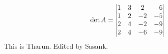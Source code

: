 \documentclass{article}
\begin{document}
$$\det A =
\begin{vmatrix}
1 & 3 & 2 & -6 \\ 
1 & 2 & -2 & -5 \\ 
2 & 4 & -2 & -9 \\ 
2 & 4 & -6 & -9  \notag
\end{vmatrix}
$$
This is Tharun.
Edited by Sasank.
\end{document}
